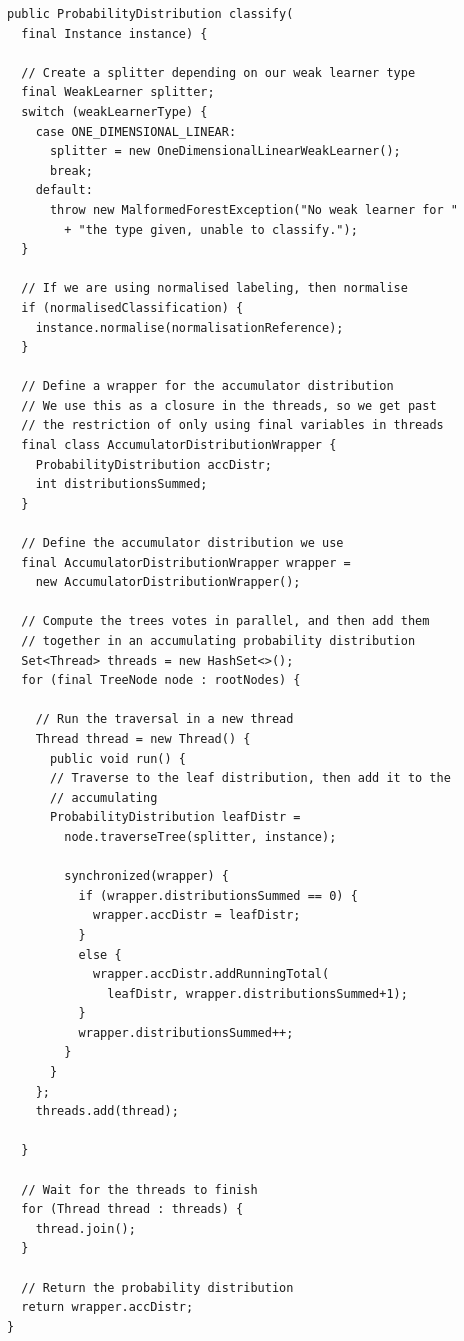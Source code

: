\documentclass[12pt,twoside,notitlepage]{report}
\begin{document}
    \begin{lstlisting}[caption={The implementation code for classification using a decision forest.}, label={lst:actualTraverseTree}]
public ProbabilityDistribution classify(
  final Instance instance) {
  
  // Create a splitter depending on our weak learner type
  final WeakLearner splitter;
  switch (weakLearnerType) {
    case ONE_DIMENSIONAL_LINEAR:
      splitter = new OneDimensionalLinearWeakLearner();
      break;
    default:
      throw new MalformedForestException("No weak learner for "
        + "the type given, unable to classify.");
  }
  
  // If we are using normalised labeling, then normalise
  if (normalisedClassification) {
    instance.normalise(normalisationReference);
  }
  
  // Define a wrapper for the accumulator distribution
  // We use this as a closure in the threads, so we get past 
  // the restriction of only using final variables in threads
  final class AccumulatorDistributionWrapper {
    ProbabilityDistribution accDistr;
    int distributionsSummed;
  }
  
  // Define the accumulator distribution we use
  final AccumulatorDistributionWrapper wrapper = 
    new AccumulatorDistributionWrapper();
  
  // Compute the trees votes in parallel, and then add them 
  // together in an accumulating probability distribution
  Set<Thread> threads = new HashSet<>();
  for (final TreeNode node : rootNodes) {
    
    // Run the traversal in a new thread
    Thread thread = new Thread() {
      public void run() {
      // Traverse to the leaf distribution, then add it to the 
      // accumulating
      ProbabilityDistribution leafDistr = 
        node.traverseTree(splitter, instance);

        synchronized(wrapper) {
          if (wrapper.distributionsSummed == 0) {
            wrapper.accDistr = leafDistr;
          }
          else {
            wrapper.accDistr.addRunningTotal(
              leafDistr, wrapper.distributionsSummed+1);
          }
          wrapper.distributionsSummed++;
        }
      }
    };
    threads.add(thread);
    
  }
  
  // Wait for the threads to finish
  for (Thread thread : threads) {
    thread.join();
  }
  
  // Return the probability distribution
  return wrapper.accDistr;
}
    \end{lstlisting}
\end{document}
